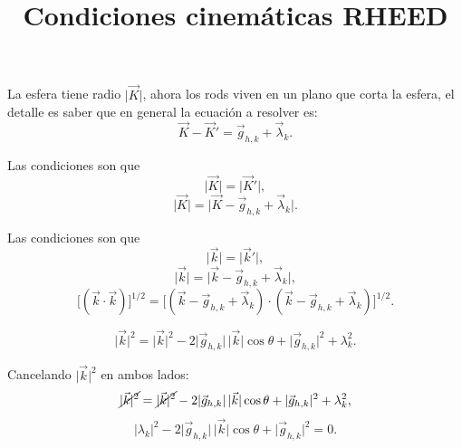 \documentclass[12pt]{article}
\title{Condiciones cinemáticas RHEED}
\author{}
\date{}
\begin{document}
\maketitle

La esfera tiene radio \(\lvert\vec{K}\rvert\), ahora los rods viven en un
plano que corta la esfera, el detalle es saber que en general la ecuación
a resolver es:
\begin{equation}
  \vec{K}-\vec{K}'=\vec{g}_{h,k}+\vec{\lambda}_{k}.
\end{equation}

Las condiciones son que
\begin{equation}
  \lvert\vec{K}\rvert=\lvert\vec{K}'\rvert,
\end{equation}
\begin{equation}
  \lvert\vec{K}\rvert=\lvert\vec{K}-\vec{g}_{h,k}+\vec{\lambda}_{k}\rvert.
\end{equation}

Las condiciones son que
\begin{equation}
  \lvert\vec{k}\rvert=\lvert\vec{k}'\rvert,
\end{equation}
\begin{equation}
  \lvert\vec{k}\rvert=\lvert\vec{k}-\vec{g}_{h,k}+\vec{\lambda}_{k}\rvert,
\end{equation}
\begin{equation}
  \bigl[(\vec{k}\cdot\vec{k})\bigr]^{1/2}
  =
  \bigl[
    (\vec{k}-\vec{g}_{h,k}+\vec{\lambda}_{k})
    \cdot
    (\vec{k}-\vec{g}_{h,k}+\vec{\lambda}_{k})
  \bigr]^{1/2}.
\end{equation}

\begin{equation}
  \lvert\vec{k}\rvert^{2}
  =
  \lvert\vec{k}\rvert^{2}
  -2\lvert\vec{g}_{h,k}\rvert\,\lvert\vec{k}\rvert\cos\theta
  +\lvert\vec{g}_{h,k}\rvert^{2}
  +\lambda_{k}^{2}.
\end{equation}

Cancelando \(\lvert\vec{k}\rvert^{2}\) en ambos lados:
\begin{equation}
  \cancel{\lvert\vec{k}\rvert^{2}}
  =
  \cancel{\lvert\vec{k}\rvert^{2}}
  -2\lvert\vec{g}_{h,k}\rvert\,\lvert\vec{k}\rvert\cos\theta
  +\lvert\vec{g}_{h,k}\rvert^{2}
  +\lambda_{k}^{2},
\end{equation}
\begin{equation}
  \lvert\lambda_{k}\rvert^{2}
  -2\lvert\vec{g}_{h,k}\rvert\,\lvert\vec{k}\rvert\cos\theta
  +\lvert\vec{g}_{h,k}\rvert^{2}
  =0.
\end{equation}
\end{document}
